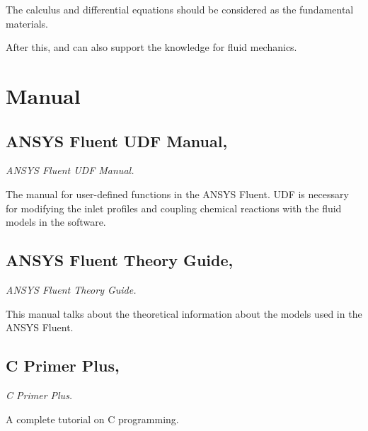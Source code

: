 \documentclass[11pt]{report}
\begin{document}
The calculus and differential equations should be considered as the fundamental materials.

After this, \cite{wang2014fluid} and \cite{kundu2012fluid} can also support the knowledge for fluid mechanics.

\section{Manual}
%
%
\subsection[ANSYS Fluent UDF Manual]{ANSYS Fluent UDF Manual, \cite{udfmanual}}
\textit{ANSYS Fluent UDF Manual.}

The manual for user-defined functions in the ANSYS Fluent. 
UDF is necessary for modifying the inlet profiles and coupling chemical reactions with the fluid models in the software.
%
%
\subsection[ANSYS Fluent Theory Guide]{ANSYS Fluent Theory Guide, \cite{FluentTheoryGuide}}
\textit{ANSYS Fluent Theory Guide.}

This manual talks about the theoretical information about the models used in the ANSYS Fluent.

%
%
\subsection[C Primer Plus]{C Primer Plus, \cite{Prata:2013:CPP:2578965}}
\textit{C Primer Plus.}

A complete tutorial on C programming.

\newpage


\end{document}
